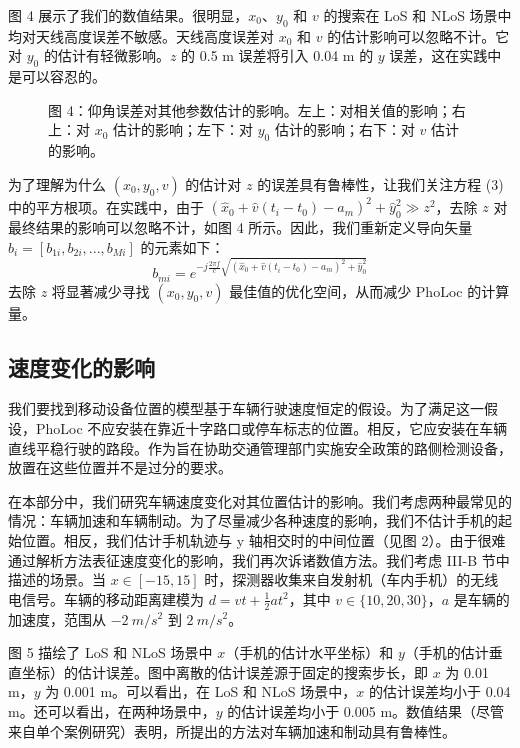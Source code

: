 \documentclass[journal, onecolumn]{IEEEtran}
\begin{document}
图 4 展示了我们的数值结果。很明显，$x_{0}$、$y_{0}$ 和 $v$ 的搜索在 LoS 和 NLoS 场景中均对天线高度误差不敏感。天线高度误差对 $x_{0}$ 和 $v$ 的估计影响可以忽略不计。它对 $y_{0}$ 的估计有轻微影响。$z$ 的 0.5 m 误差将引入 0.04 m 的 $y$ 误差，这在实践中是可以容忍的。

\begin{figure}[htbp]
\centering
\caption{图 4：仰角误差对其他参数估计的影响。左上：对相关值的影响；右上：对 $x_{0}$ 估计的影响；左下：对 $y_{0}$ 估计的影响；右下：对 $v$ 估计的影响。}
\label{fig:4}
\end{figure}

为了理解为什么 $(x_{0},y_{0},v)$ 的估计对 $z$ 的误差具有鲁棒性，让我们关注方程 (3) 中的平方根项。在实践中，由于 $(\hat{x}_{0}+\hat{v}(t_{i}-t_{0})-a_{m})^{2}+\hat{y}_{0}^{2}\gg z^{2}$，去除 $z$ 对最终结果的影响可以忽略不计，如图 4 所示。因此，我们重新定义导向矢量 $b_{i}=[b_{1i},b_{2i},...,b_{Mi}]$ 的元素如下：
\begin{equation}
b_{mi}=e^{-j\frac{2\pi f}{c}\sqrt{(\hat{x}_{0}+\hat{v}(t_{i}-t_{0})-a_{m})^{2}+\hat{y}_{0}^{2}}}
\end{equation}
去除 $z$ 将显著减少寻找 $(x_{0},y_{0},v)$ 最佳值的优化空间，从而减少 PhoLoc 的计算量。

\subsection{速度变化的影响}
我们要找到移动设备位置的模型基于车辆行驶速度恒定的假设。为了满足这一假设，PhoLoc 不应安装在靠近十字路口或停车标志的位置。相反，它应安装在车辆直线平稳行驶的路段。作为旨在协助交通管理部门实施安全政策的路侧检测设备，放置在这些位置并不是过分的要求。

在本部分中，我们研究车辆速度变化对其位置估计的影响。我们考虑两种最常见的情况：车辆加速和车辆制动。为了尽量减少各种速度的影响，我们不估计手机的起始位置。相反，我们估计手机轨迹与 y 轴相交时的中间位置（见图 2）。由于很难通过解析方法表征速度变化的影响，我们再次诉诸数值方法。我们考虑 III-B 节中描述的场景。当 $x\in[-15,15]$ 时，探测器收集来自发射机（车内手机）的无线电信号。车辆的移动距离建模为 $d=vt+\frac{1}{2}at^{2}$，其中 $v\in\{10,20,30\}$，$a$ 是车辆的加速度，范围从 $-2~m/s^{2}$ 到 $2~m/s^{2}$。

图 5 描绘了 LoS 和 NLoS 场景中 $x$（手机的估计水平坐标）和 $y$（手机的估计垂直坐标）的估计误差。图中离散的估计误差源于固定的搜索步长，即 $x$ 为 0.01 m，$y$ 为 0.001 m。可以看出，在 LoS 和 NLoS 场景中，$x$ 的估计误差均小于 0.04 m。还可以看出，在两种场景中，$y$ 的估计误差均小于 0.005 m。数值结果（尽管来自单个案例研究）表明，所提出的方法对车辆加速和制动具有鲁棒性。
\end{document}
